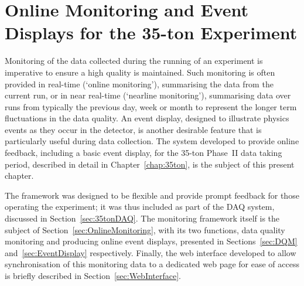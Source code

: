
\graphicspath{{OnlineMonitoring/Figs/}}

\chapter{Online Monitoring and Event Displays for the 35-ton Experiment}\label{chap:OnlineMonitoring}

Monitoring of the data collected during the running of an experiment is imperative to ensure a high quality is maintained.  Such monitoring is often provided in real-time (`online monitoring'), summarising the data from the current run, or in near real-time (`nearline monitoring'), summarising data over runs from typically the previous day, week or month to represent the longer term fluctuations in the data quality.  An event display, designed to illustrate physics events as they occur in the detector, is another desirable feature that is particularly useful during data collection.  The system developed to provide online feedback, including a basic event display, for the 35-ton Phase~II data taking period, described in detail in Chapter~\ref{chap:35ton}, is the subject of this present chapter.

The framework was designed to be flexible and provide prompt feedback for those operating the experiment; it was thus included as part of the DAQ system, discussed in Section~\ref{sec:35tonDAQ}.  The monitoring framework itself is the subject of Section~\ref{sec:OnlineMonitoring}, with its two functions, data quality monitoring and producing online event displays, presented in Sections~\ref{sec:DQM} and~\ref{sec:EventDisplay} respectively.  Finally, the web interface developed to allow synchronisation of this monitoring data to a dedicated web page for ease of access is briefly described in Section~\ref{sec:WebInterface}.


